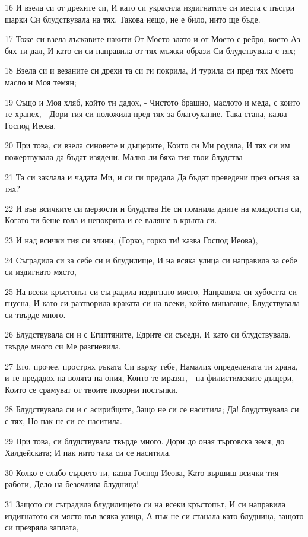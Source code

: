 \par 16 И взела си от дрехите си, И като си украсила издигнатите си места с пъстри шарки Си блудствувала на тях. Такова нещо, не е било, нито ще бъде.
\par 17 Тоже си взела лъскавите накити От Моето злато и от Моето с ребро, което Аз бях ти дал, И като си си направила от тях мъжки образи Си блудствувала с тях;
\par 18 Взела си и везаните си дрехи та си ги покрила, И турила си пред тях Моето масло и Моя темян;
\par 19 Също и Моя хляб, който ти дадох, - Чистото брашно, маслото и меда, с които те хранех, - Дори тия си положила пред тях за благоухание. Така стана, казва Господ Иеова.
\par 20 При това, си взела синовете и дъщерите, Които си Ми родила, И тях си им пожертвувала да бъдат изядени. Малко ли бяха тия твои блудства
\par 21 Та си заклала и чадата Ми, и си ги предала Да бъдат преведени през огъня за тях?
\par 22 И във всичките си мерзости и блудства Не си помнила дните на младостта си, Когато ти беше гола и непокрита и се валяше в кръвта си.
\par 23 И над всички тия си злини, (Горко, горко ти! казва Господ Иеова),
\par 24 Съградила си за себе си и блудилище, И на всяка улица си направила за себе си издигнато място,
\par 25 На всеки кръстопът си съградила издигнато място, Направила си хубостта си гнусна, И като си разтворила краката си на всеки, който минаваше, Блудствувала си твърде много.
\par 26 Блудствувала си и с Египтяните, Едрите си съседи, И като си блудствувала, твърде много си Ме разгневила.
\par 27 Ето, прочее, прострях ръката Си върху тебе, Намалих определената ти храна, и те предадох на волята на ония, Които те мразят, - на филистимските дъщери, Които се срамуват от твоите позорни постъпки.
\par 28 Блудствувала си и с асирийците, Защо не си се наситила; Да! блудствувала си с тях, Но пак не си се наситила.
\par 29 При това, си блудствувала твърде много. Дори до оная търговска земя, до Халдейската; И пак нито така си се наситила.
\par 30 Колко е слабо сърцето ти, казва Господ Иеова, Като вършиш всички тия работи, Дело на безочлива блудница!
\par 31 Защото си съградила блудилището си на всеки кръстопът, И си направила издигнатото си място във всяка улица, А пък не си станала като блудница, защото си презряла заплата,
